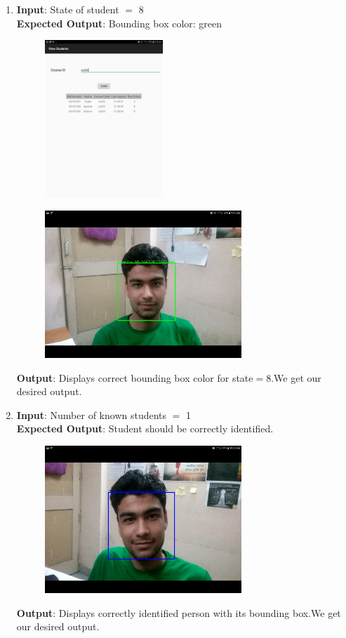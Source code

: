 \documentclass{scrreprt}
\begin{document}
\begin{itemize}
\begin{enumerate}
\item \textbf{Input}: State of student $=$ 8\\
\textbf{Expected Output}: Bounding box color: green
\begin{figure}[H]
\centering
\includegraphics[width=0.42\textwidth, keepaspectratio]{cambon.jpg}
\end{figure}
\begin{figure}[H]
\centering
\includegraphics[width=0.7\textwidth, keepaspectratio]{camboncase.jpg}
\end{figure}
\textbf{Output}: Displays correct bounding box color for state$=$8.We get our desired output.

\item \textbf{Input}: Number of known students $=$ 1\\
\textbf{Expected Output}: Student should be correctly identified.
\begin{figure}[H]
\centering
\includegraphics[width=0.7\textwidth, keepaspectratio]{cam1stud.jpg}
\end{figure}
\textbf{Output}: Displays correctly identified person with its bounding box.We get our desired output.


\end{enumerate}
\end{itemize}
\end{document}
